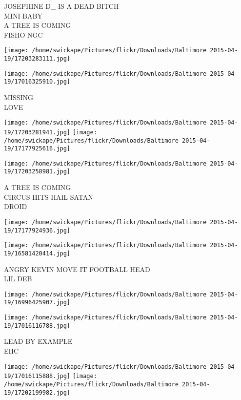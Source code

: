 \documentclass[10pt,letterpaper]{article}
\begin{document}
JOSEPHINE D\_ IS A DEAD BITCH\\
MINI BABY\\
A TREE IS COMING\\
FISHO NGC\\
\pagebreak

\texttt{[image: /home/swickape/Pictures/flickr/Downloads/Baltimore 2015-04-19/17203283111.jpg]}

\vspace{0.25in}
\texttt{[image: /home/swickape/Pictures/flickr/Downloads/Baltimore 2015-04-19/17016325910.jpg]}

MISSING\\
LOVE\\
\pagebreak

\texttt{[image: /home/swickape/Pictures/flickr/Downloads/Baltimore 2015-04-19/17203281941.jpg]}
\texttt{[image: /home/swickape/Pictures/flickr/Downloads/Baltimore 2015-04-19/17177925616.jpg]}

\texttt{[image: /home/swickape/Pictures/flickr/Downloads/Baltimore 2015-04-19/17203258981.jpg]}

A TREE IS COMING\\
CIRCUS HITS HAIL SATAN\\
DROID\\
\pagebreak

\texttt{[image: /home/swickape/Pictures/flickr/Downloads/Baltimore 2015-04-19/17177924936.jpg]}

\vspace{0.25in}
\texttt{[image: /home/swickape/Pictures/flickr/Downloads/Baltimore 2015-04-19/16581420414.jpg]}

ANGRY KEVIN MOVE IT FOOTBALL HEAD\\
LIL DEB\\
\pagebreak

\texttt{[image: /home/swickape/Pictures/flickr/Downloads/Baltimore 2015-04-19/16996425907.jpg]}

\vspace{0.25in}
\texttt{[image: /home/swickape/Pictures/flickr/Downloads/Baltimore 2015-04-19/17016116788.jpg]}

LEAD BY EXAMPLE\\
EHC\\
\pagebreak

\texttt{[image: /home/swickape/Pictures/flickr/Downloads/Baltimore 2015-04-19/17016115888.jpg]}
\texttt{[image: /home/swickape/Pictures/flickr/Downloads/Baltimore 2015-04-19/17202199982.jpg]}
\end{document}
